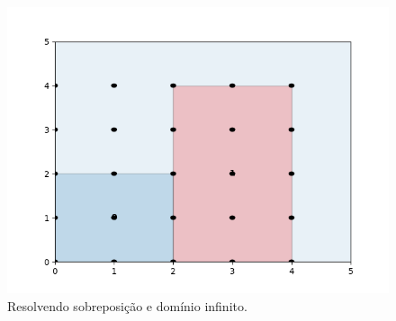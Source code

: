 \begin{figure}[!htb]
    \centering
    \includegraphics[scale=0.5]{utils/images/discrete_example}
    \caption{Resolvendo sobreposição e domínio infinito.}
    \label{fig:sobreposicao-dominio4}
\end{figure}
